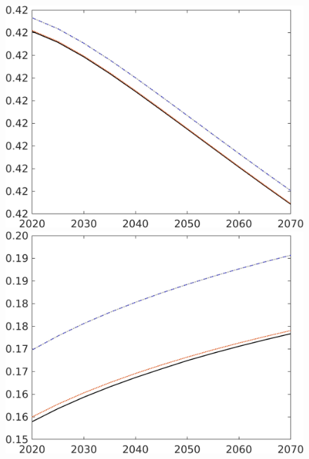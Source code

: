 \begin{figure}[h!!]
\begin{minipage}[]{0.32\textwidth}
	\end{minipage}
	\begin{minipage}[]{0.32\textwidth}
		\includegraphics[width=1\textwidth]{../../codding_model/own_basedOnFried/optimalPol_190722_tidiedUp/figures/all_10Aout22/CountNskTaulLF_target_EY_spillover0_sep1_extern0_PV1_etaa0.79_lgd0.png}
	\end{minipage}
	\begin{minipage}[]{0.32\textwidth}
		\includegraphics[width=1\textwidth]{../../codding_model/own_basedOnFried/optimalPol_190722_tidiedUp/figures/all_10Aout22/CountNskTaulLF_target_LgLf_spillover0_sep1_extern0_PV1_etaa0.79_lgd0.png}

\end{minipage}
\end{figure}
